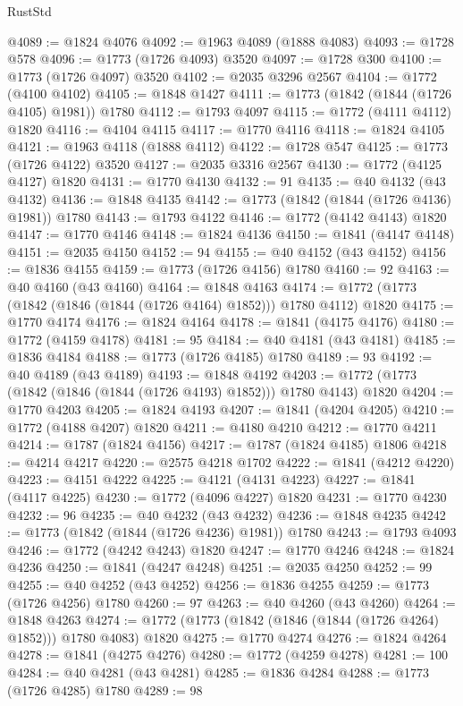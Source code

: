 \begin{lexlean}{RustStd}
\begin{coremodule}
@4089 := @1824 @4076
@4092 := @1963 @4089 (@1888 @4083)
@4093 := @1728 @578
@4096 := @1773 (@1726 @4093) @3520
@4097 := @1728 @300
@4100 := @1773 (@1726 @4097) @3520
@4102 := @2035 @3296 @2567
@4104 := @1772 (@4100 @4102)
@4105 := @1848 @1427
@4111 := @1773 (@1842 (@1844 (@1726 @4105) @1981)) @1780
@4112 := @1793 @4097
@4115 := @1772 (@4111 @4112) @1820
@4116 := @4104 @4115
@4117 := @1770 @4116
@4118 := @1824 @4105
@4121 := @1963 @4118 (@1888 @4112)
@4122 := @1728 @547
@4125 := @1773 (@1726 @4122) @3520
@4127 := @2035 @3316 @2567
@4130 := @1772 (@4125 @4127) @1820
@4131 := @1770 @4130
@4132 := 91
@4135 := @40 @4132 (@43 @4132)
@4136 := @1848 @4135
@4142 := @1773 (@1842 (@1844 (@1726 @4136) @1981)) @1780
@4143 := @1793 @4122
@4146 := @1772 (@4142 @4143) @1820
@4147 := @1770 @4146
@4148 := @1824 @4136
@4150 := @1841 (@4147 @4148)
@4151 := @2035 @4150
@4152 := 94
@4155 := @40 @4152 (@43 @4152)
@4156 := @1836 @4155
@4159 := @1773 (@1726 @4156) @1780
@4160 := 92
@4163 := @40 @4160 (@43 @4160)
@4164 := @1848 @4163
@4174 := @1772 (@1773 (@1842 (@1846 (@1844 (@1726 @4164) @1852))) @1780 @4112) @1820
@4175 := @1770 @4174
@4176 := @1824 @4164
@4178 := @1841 (@4175 @4176)
@4180 := @1772 (@4159 @4178)
@4181 := 95
@4184 := @40 @4181 (@43 @4181)
@4185 := @1836 @4184
@4188 := @1773 (@1726 @4185) @1780
@4189 := 93
@4192 := @40 @4189 (@43 @4189)
@4193 := @1848 @4192
@4203 := @1772 (@1773 (@1842 (@1846 (@1844 (@1726 @4193) @1852))) @1780 @4143) @1820
@4204 := @1770 @4203
@4205 := @1824 @4193
@4207 := @1841 (@4204 @4205)
@4210 := @1772 (@4188 @4207) @1820
@4211 := @4180 @4210
@4212 := @1770 @4211
@4214 := @1787 (@1824 @4156)
@4217 := @1787 (@1824 @4185) @1806
@4218 := @4214 @4217
@4220 := @2575 @4218 @1702
@4222 := @1841 (@4212 @4220)
@4223 := @4151 @4222
@4225 := @4121 (@4131 @4223)
@4227 := @1841 (@4117 @4225)
@4230 := @1772 (@4096 @4227) @1820
@4231 := @1770 @4230
@4232 := 96
@4235 := @40 @4232 (@43 @4232)
@4236 := @1848 @4235
@4242 := @1773 (@1842 (@1844 (@1726 @4236) @1981)) @1780
@4243 := @1793 @4093
@4246 := @1772 (@4242 @4243) @1820
@4247 := @1770 @4246
@4248 := @1824 @4236
@4250 := @1841 (@4247 @4248)
@4251 := @2035 @4250
@4252 := 99
@4255 := @40 @4252 (@43 @4252)
@4256 := @1836 @4255
@4259 := @1773 (@1726 @4256) @1780
@4260 := 97
@4263 := @40 @4260 (@43 @4260)
@4264 := @1848 @4263
@4274 := @1772 (@1773 (@1842 (@1846 (@1844 (@1726 @4264) @1852))) @1780 @4083) @1820
@4275 := @1770 @4274
@4276 := @1824 @4264
@4278 := @1841 (@4275 @4276)
@4280 := @1772 (@4259 @4278)
@4281 := 100
@4284 := @40 @4281 (@43 @4281)
@4285 := @1836 @4284
@4288 := @1773 (@1726 @4285) @1780
@4289 := 98

\end{coremodule}
\end{lexlean}
